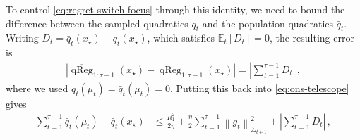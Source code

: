 \documentclass{article}
\newcommand{\E}{\mathbb E}
\newcommand{\1}{\mathbf 1}
\newcommand{\normm}[2]{\left\lVert #1\right\rVert_{#2}}
\begin{document}
To control \eqref{eq:regret-switch-focus} through this identity,
we need to bound the difference between the sampled quadratics $q_t$
and the population quadratics $\bar{q}_t$.
Writing $D_t=\bar{q}_t(x_{\star})-q_t(x_{\star})$, which satisfies $\E_t[D_t]=0$,
the resulting error is
\begin{align}
    \left|
    \overline{\operatorname{qReg}}_{1:\tau-1}(x_{\star})-\operatorname{qReg}_{1:\tau-1}(x_{\star})
    \right|
    =
    \left|
    \sum_{t=1}^{\tau-1}
    D_t
    \right|\,,
\end{align}
where we used $q_t(\mu_t)=\bar{q}_t(\mu_t) = 0$.
Putting this back into \eqref{eq:ons-telescope} gives
\begin{align}
    \sum_{t=1}^{\tau-1}
    \bar{q}_t(\mu_t)-\bar{q}_t(x_\star)
     & \leq
    \frac{R_1^2}{2\eta }
    +\frac{\eta}{2}\sum_{t=1}^{\tau-1}\normm{g_t}{\Sigma_{t+1}}^2
    +\left|
    \sum_{t=1}^{\tau-1}
    D_t
    \right|\,,
\end{align}
\end{document}
